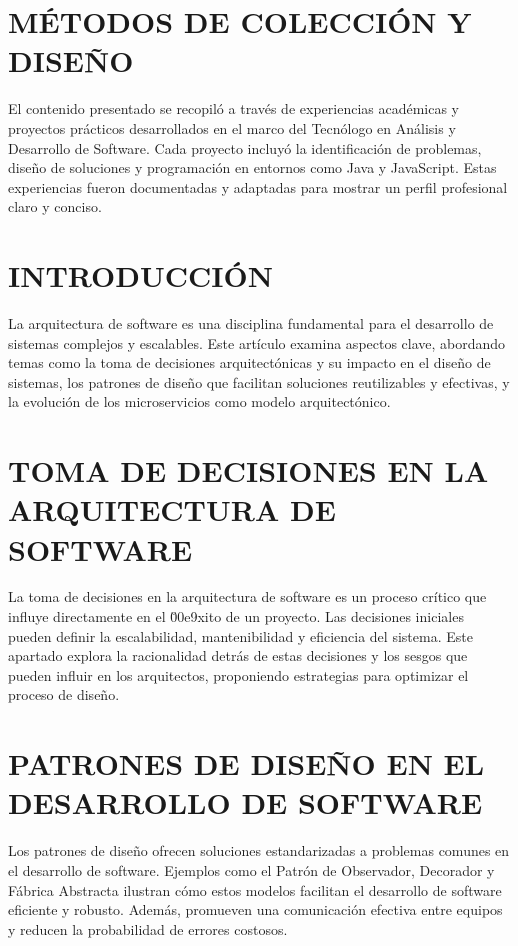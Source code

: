 \documentclass{IEEEoj-data}
\begin{document}
\section*{MÉTODOS DE COLECCIÓN Y DISEÑO}

El contenido presentado se recopil\'o a trav\'es de experiencias acad\'emicas y proyectos pr\'acticos desarrollados en el marco del Tecn\'ologo en An\'alisis y Desarrollo de Software. Cada proyecto incluy\'o la identificaci\'on de problemas, dise\~no de soluciones y programaci\'on en entornos como Java y JavaScript. Estas experiencias fueron documentadas y adaptadas para mostrar un perfil profesional claro y conciso.

\section*{INTRODUCCI\'ON}

La arquitectura de software es una disciplina fundamental para el desarrollo de sistemas complejos y escalables. Este art\'iculo examina aspectos clave, abordando temas como la toma de decisiones arquitect\'onicas y su impacto en el dise\~no de sistemas, los patrones de dise\~no que facilitan soluciones reutilizables y efectivas, y la evoluci\'on de los microservicios como modelo arquitect\'onico.

\section*{TOMA DE DECISIONES EN LA ARQUITECTURA DE SOFTWARE}

La toma de decisiones en la arquitectura de software es un proceso cr\'itico que influye directamente en el \u00e9xito de un proyecto. Las decisiones iniciales pueden definir la escalabilidad, mantenibilidad y eficiencia del sistema. Este apartado explora la racionalidad detr\'as de estas decisiones y los sesgos que pueden influir en los arquitectos, proponiendo estrategias para optimizar el proceso de dise\~no.

\section*{PATRONES DE DISE\~NO EN EL DESARROLLO DE SOFTWARE}

Los patrones de dise\~no ofrecen soluciones estandarizadas a problemas comunes en el desarrollo de software. Ejemplos como el Patr\'on de Observador, Decorador y F\'abrica Abstracta ilustran c\'omo estos modelos facilitan el desarrollo de software eficiente y robusto. Adem\'as, promueven una comunicaci\'on efectiva entre equipos y reducen la probabilidad de errores costosos.
\end{document}
